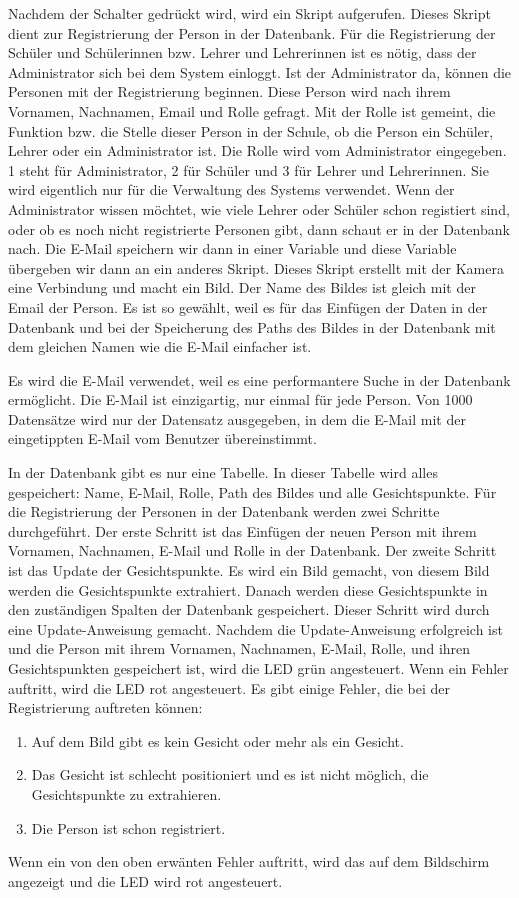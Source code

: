 \begin{enumerate}
Nachdem der Schalter gedr\"uckt wird, wird ein Skript aufgerufen. Dieses Skript dient zur Registrierung der Person in der Datenbank.
F\"ur die Registrierung der Sch\"uler und Sch\"ulerinnen bzw. Lehrer und Lehrerinnen ist es n\"otig, dass der Administrator sich bei dem System einloggt. Ist der Administrator da, k\"onnen die Personen mit der Registrierung beginnen.
Diese Person wird nach ihrem Vornamen, Nachnamen, Email und Rolle gefragt. Mit der Rolle ist gemeint, die Funktion bzw. die Stelle dieser Person in der Schule, ob die Person ein Sch\"uler, Lehrer oder ein Administrator ist. Die Rolle wird vom Administrator eingegeben. 1 steht f\"ur Administrator, 2 f\"ur Sch\"uler und 3 f\"ur Lehrer und Lehrerinnen. Sie wird eigentlich nur f\"ur die Verwaltung des Systems verwendet. Wenn der Administrator wissen m\"ochtet, wie viele Lehrer oder Sch\"uler schon registiert sind, oder ob es noch nicht registrierte Personen gibt, dann schaut er in der Datenbank nach.
Die E-Mail speichern wir dann in einer Variable und diese Variable \"ubergeben wir dann an ein anderes Skript. Dieses Skript erstellt mit der Kamera eine Verbindung und macht ein Bild. Der Name des Bildes ist gleich mit der Email der Person. Es ist so gew\"ahlt, weil es f\"ur das Einf\"ugen der Daten in der Datenbank und bei der Speicherung des Paths des Bildes in der Datenbank mit dem gleichen Namen wie die E-Mail einfacher ist.

Es wird die E-Mail verwendet, weil es eine performantere Suche in der Datenbank erm\"oglicht. Die E-Mail ist einzigartig, nur einmal f\"ur jede Person. Von 1000 Datens\"atze wird nur der Datensatz ausgegeben, in dem die E-Mail mit der eingetippten E-Mail vom Benutzer \"ubereinstimmt.

In der Datenbank gibt es nur eine Tabelle. In dieser Tabelle wird alles gespeichert: Name, E-Mail, Rolle, Path des Bildes und alle Gesichtspunkte. Für die Registrierung der Personen in der Datenbank werden zwei Schritte durchgef\"uhrt. Der erste Schritt ist das Einfügen der neuen Person mit ihrem Vornamen, Nachnamen, E-Mail und Rolle in der Datenbank. Der zweite Schritt ist das Update der Gesichtspunkte. Es wird ein Bild gemacht, von diesem Bild werden die Gesichtspunkte extrahiert. Danach werden diese Gesichtspunkte in den zuständigen Spalten der Datenbank gespeichert. Dieser Schritt wird durch eine Update-Anweisung gemacht. Nachdem die Update-Anweisung erfolgreich ist und die Person mit ihrem Vornamen, Nachnamen, E-Mail, Rolle, und ihren Gesichtspunkten gespeichert ist, wird die LED grün angesteuert. Wenn ein Fehler auftritt, wird die LED rot angesteuert. Es gibt einige Fehler, die bei der Registrierung auftreten können: 
\begin{enumerate}
	\item Auf dem Bild gibt es kein Gesicht oder mehr als ein Gesicht.
	\item Das Gesicht ist schlecht positioniert und es ist nicht m\"oglich, die Gesichtspunkte zu extrahieren.
	\item Die Person ist schon registriert.
\end{enumerate}
Wenn ein von den oben erw\"anten Fehler auftritt, wird das auf dem Bildschirm angezeigt und die LED wird rot angesteuert.
\end{enumerate}

